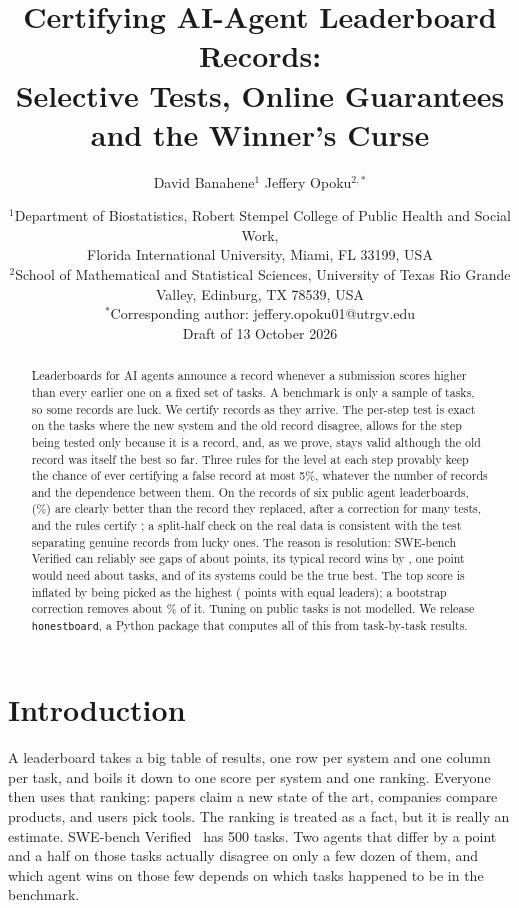 \documentclass[11pt]{article}
\title{Certifying AI-Agent Leaderboard Records:\\Selective Tests, Online Guarantees and the Winner's Curse}
\author{David Banahene$^{1}$ \quad Jeffery Opoku$^{2,*}$}
\date{\small
$^1$Department of Biostatistics, Robert Stempel College of Public Health and Social Work,\\
Florida International University, Miami, FL 33199, USA\\
$^2$School of Mathematical and Statistical Sciences, University of Texas Rio Grande Valley, Edinburg, TX 78539, USA\\[3pt]
$^*$Corresponding author: jeffery.opoku01@utrgv.edu\\[8pt]
Draft of 13 October 2026}
\begin{document}
\maketitle

\begin{abstract}
Leaderboards for AI agents announce a record whenever a submission scores higher than every earlier one on a fixed set of tasks.
A benchmark is only a sample of tasks, so some records are luck.
We certify records as they arrive.
The per-step test is exact on the tasks where the new system and the old record disagree, allows for the step being tested only because it is a record, and, as we prove, stays valid although the old record was itself the best so far.
Three rules for the level at each step provably keep the chance of ever certifying a false record at most 5\%, whatever the number of records and the dependence between them.
On the \NumTotalSteps{} records of six public agent leaderboards, \NumTotalSig{} (\NumTotalSigPct\%) are clearly better than the record they replaced, \NumTotalHolm{} after a correction for many tests, and the rules certify \NumCertTotalSpend{}; a split-half check on the real data is consistent with the test separating genuine records from lucky ones.
The reason is resolution: SWE-bench Verified can reliably see gaps of about \NumVerifiedMDD{} points, its typical record wins by \NumVerifiedMedianMargin{}, one point would need about \NumVerifiedTasksOnePt{} tasks, and \NumVerifiedSet{} of its \NumVerifiedK{} systems could be the true best.
The top score is inflated by being picked as the highest (\NumVBunchNCNaiveBias{} points with equal leaders); a bootstrap correction removes about \NumVBunchNCReduction\% of it.
Tuning on public tasks is not modelled.
We release \texttt{honestboard}, a Python package that computes all of this from task-by-task results.
\end{abstract}

\section{Introduction}
A leaderboard takes a big table of results, one row per system and one column per task, and boils it down to one score per system and one ranking.
Everyone then uses that ranking: papers claim a new state of the art, companies compare products, and users pick tools.
The ranking is treated as a fact, but it is really an estimate.
SWE-bench Verified~\citep{jimenez2024swebench} has 500 tasks.
Two agents that differ by a point and a half on those tasks actually disagree on only a few dozen of them, and which agent wins on those few depends on which tasks happened to be in the benchmark.
\end{document}
